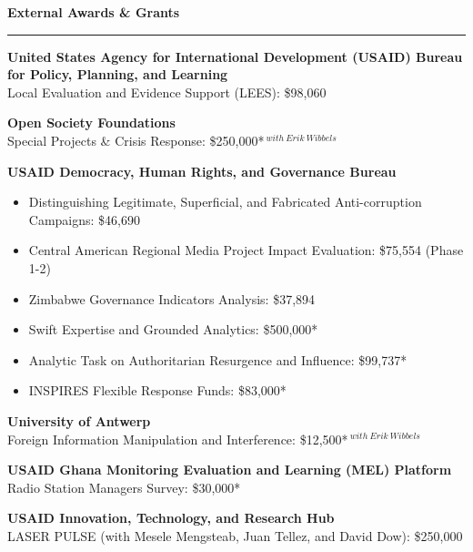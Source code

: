 \documentclass[11pt]{article}
\begin{document}


\textbf{\large External Awards \& Grants}\\
\rule[3mm]{\textwidth}{.2pt}
\textbf{United States Agency for International Development (USAID) Bureau for Policy, Planning, and Learning}\\
\hspace{1em} Local Evaluation and Evidence Support (LEES): \$98,060

\textbf{Open Society Foundations}\\
\hspace{1em} Special Projects \& Crisis Response: \$250,000*$^{\ with\ Erik\ Wibbels}$
\bigskip

\textbf{USAID Democracy, Human Rights, and Governance Bureau}
\begin{itemize} \itemsep -5pt
\item Distinguishing Legitimate, Superficial, and Fabricated Anti-corruption Campaigns: \$46,690
\item Central American Regional Media Project Impact Evaluation: \$75,554 (Phase 1-2)
\item Zimbabwe Governance Indicators Analysis: \$37,894
\item Swift Expertise and Grounded Analytics: \$500,000*
\item Analytic Task on Authoritarian Resurgence and Influence: \$99,737*
\item INSPIRES Flexible Response Funds: \$83,000*
\end{itemize}

\textbf{University of Antwerp}\\
\hspace{1em} Foreign Information Manipulation and Interference: \$12,500*$^{\ with\ Erik\ Wibbels}$

\textbf{USAID Ghana Monitoring Evaluation and Learning (MEL) Platform}\\
Radio Station Managers Survey: \$30,000*

\textbf{USAID Innovation, Technology, and Research Hub}\\
LASER PULSE (with Mesele Mengsteab, Juan Tellez, and David Dow): \$250,000
\end{document}
